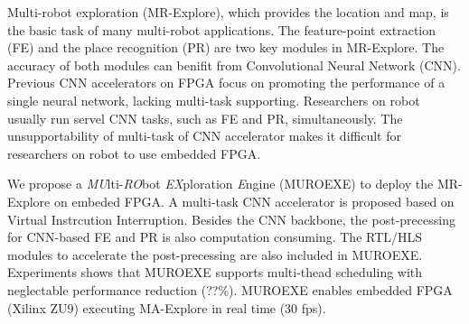 Multi-robot exploration (MR-Explore), which provides the location and map, is the basic task of many multi-robot applications. 
The feature-point extraction (FE) and the place recognition (PR) are two key modules in MR-Explore.
The accuracy of both modules can benifit from Convolutional Neural Network (CNN).
Previous CNN accelerators on FPGA focus on promoting the performance of a single neural network, lacking multi-task supporting.
Researchers on robot usually run servel CNN tasks, such as FE and PR, simultaneously.
The unsupportability of multi-task of CNN accelerator makes it difficult for researchers on robot to use embedded FPGA.

We propose a \textit{MU}lti-\textit{RO}bot \textit{EX}ploration \textit{E}ngine (MUROEXE) to deploy the MR-Explore on embeded FPGA. A multi-task CNN accelerator is proposed based on Virtual Instrcution Interruption. Besides the CNN backbone, the post-precessing for CNN-based FE and PR is also computation consuming. 
The RTL/HLS modules to accelerate the post-precessing are also included in MUROEXE. Experiments shows that MUROEXE supports multi-thead scheduling with neglectable performance reduction (??\%). MUROEXE enables embedded FPGA (Xilinx ZU9) executing MA-Explore in real time (30 fps).